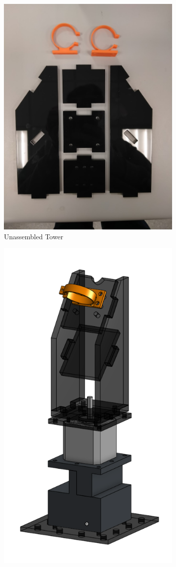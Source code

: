 \begin{figure}
    \centering
    \begin{subfigure}{.3\textwidth}
      \centering
      \includegraphics[height=\linewidth]{img/Tower_pcs.jpg}
      \caption{Unassembled Tower}
    \end{subfigure}%
    \begin{subfigure}{.3\textwidth}
      \centering
      \includegraphics[height=\linewidth]{img/motor_cad_mouting.png}

\end{subfigure}
\end{figure}
